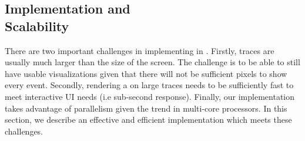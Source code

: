 \subsection{\VDP{} Implementation and \\ Scalability}
\label{sec:lviz-imp}

There are two important challenges in implementing \VDP{} in \lviz.
Firstly, traces are usually much larger than the size of the screen.
The challenge is to be able to still have usable visualizations given that
there will not be sufficient pixels to show every event.
Secondly, rendering a \VDP{} on large traces needs to be sufficiently fast to
meet interactive UI needs (i.e sub-second response).
Finally, our implementation takes advantage of parallelism given
the trend in multi-core processors.
In this section, we describe an effective and efficient implementation
which meets these challenges.




